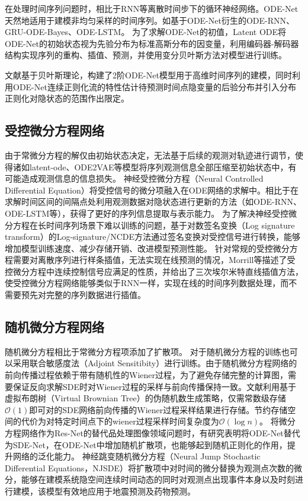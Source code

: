 在处理时间序列问题时，相比于RNN等离散时间步下的循环神经网络。ODE-Net天然地适用于建模非均匀采样的时间序列。如基于ODE-Net衍生的ODE-RNN\cite{10.5555/3454287.3454765}、GRU-ODE-Bayes\cite{brouwer2019gru}、ODE-LSTM\cite{lechner2020learning}。
为了求解ODE-Net的初值，Latent ODE\cite{10.5555/3454287.3454765}将ODE-Net的初始状态视为先验分布为标准高斯分布的因变量，利用编码器-解码器结构实现序列的重构、插值、预测，并使用变分贝叶斯方法对模型进行训练。

文献\cite{Yildiz2019}基于贝叶斯理论，构建了2阶ODE-Net模型用于高维时间序列的建模，同时利用ODE-Net连续正则化流的特性估计待预测时间点隐变量的后验分布并引入分布正则化对隐状态的范围作出限定。

\subsection{受控微分方程网络}
由于常微分方程的解仅由初始状态决定，无法基于后续的观测对轨迹进行调节，使得诸如latent-ode、ODE2VAE等模型将序列观测信息全部压缩至初始状态中，有可能造成观测信息的信息损失。
神经受控微分方程（Neural Controlled Differential Equation）\cite{kidger2020neural}将受控信号的微分项融入在ODE网络的求解中。相比于在求解时间区间的间隔点处利用观测数据对隐状态进行更新的方法（如ODE-RNN、ODE-LSTM等），获得了更好的序列信息提取与表示能力。
为了解决神经受控微分方程在长时间序列场景下难以训练的问题，基于对数签名变换（Log signature transform）的Log-signature/NCDE方法\cite{morrill2021neural}通过签名变换对受控信号进行转换，能够增加模型训练速度、减少存储开销、改进模型预测性能。
针对常规的受控微分方程需要对离散序列进行样条插值，无法实现在线预测的情况，Morrill等\cite{morrill2021online}描述了受控微分方程中连续控制信号应满足的性质，并给出了三次埃尔米特直线插值方法，使受控微分方程网络能够类似于RNN一样，实现在线的时间序列数据处理，而不需要预先对完整的序列数据进行插值。
\subsection{随机微分方程网络}
随机微分方程相比于常微分方程项添加了扩散项。
对于随机微分方程的训练也可以采用联合敏感度法（Adjoint Sensitibity）进行训练\cite{li2020scalable}。由于随机微分方程网络的前向传播过程依赖于带有随机性的Wiener过程，为了避免存储完整的计算图，需要保证反向求解SDE时对Wiener过程的采样与前向传播保持一致。文献\cite{li2020scalable}利用基于虚拟布朗树（Virtual Brownian Tree）的伪随机数生成策略，仅需常数级存储$\mathcal{O}(1)$即可对的SDE网络前向传播的Wiener过程采样结果进行存储。节约存储空间的代价为对特定时间点下的wiener过程采样时间复杂度为$\mathcal{O}(\log n)$。
将微分方程网络作为Res-Net的替代品处理图像领域问题时，有研究表明将ODE-Net替代为SDE-Net，在ODE-Net中增加随机扩散项，也能够起到随机正则化的作用，提升网络的泛化能力\cite{Oganesyan2020}。
神经跳变随机微分方程（Neural Jump Stochastic Differential Equations，NJSDE）\cite{Jia2019}将扩散项中对时间的微分替换为观测点次数的微分，能够在建模系统隐空间连续时间动态的同时对观测点出现事件本身以及时刻进行建模，该模型有效地应用于地震预测及药物预测。


